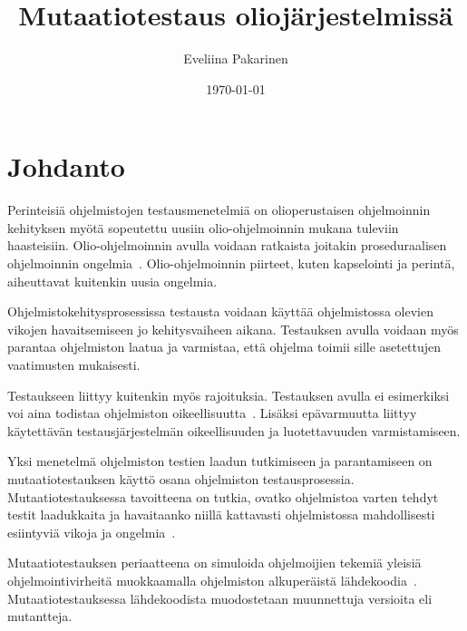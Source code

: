 \documentclass[finnish, grading]{tktltiki2}
\title{Mutaatiotestaus oliojärjestelmissä}
\author{Eveliina Pakarinen}
\date{\today}
\theoremstyle{definition}
\theoremstyle{remark}
\begin{document}

\frontmatter      %

\maketitle        %
\makeabstract     %

\tableofcontents  %


\mainmatter       %




\section{Johdanto}

Perinteisiä ohjelmistojen testausmenetelmiä on olioperustaisen ohjelmoinnin kehityksen myötä sopeutettu uusiin olio-ohjelmoinnin mukana tuleviin haasteisiin. Olio-ohjelmoinnin avulla voidaan ratkaista joitakin proseduraalisen ohjelmoinnin ongelmia~\cite[s. 86]{Mariani:Pezze:2008}. Olio-ohjelmoinnin piirteet, kuten kapselointi ja perintä, aiheuttavat kuitenkin uusia ongelmia.

Ohjelmistokehitysprosessissa testausta voidaan käyttää ohjelmistossa olevien vikojen havaitsemiseen jo kehitysvaiheen aikana. Testauksen avulla voidaan myös parantaa ohjelmiston laatua ja varmistaa, että ohjelma toimii sille asetettujen vaatimusten mukaisesti. 

Testaukseen liittyy kuitenkin myös rajoituksia. Testauksen avulla ei esimerkiksi voi aina todistaa ohjelmiston oikeellisuutta~\cite[s. 58]{Binder:1999}. Lisäksi epävarmuutta liittyy käytettävän testausjärjestelmän oikeellisuuden ja luotettavuuden varmistamiseen.

Yksi menetelmä ohjelmiston testien laadun tutkimiseen ja parantamiseen on mutaatiotestauksen käyttö osana ohjelmiston testausprosessia. Mutaatiotestauksessa tavoitteena on tutkia, ovatko ohjelmistoa varten tehdyt testit laadukkaita ja havaitaanko niillä kattavasti ohjelmistossa mahdollisesti esiintyviä vikoja ja ongelmia~\cite[s. 649]{Jia:Harman:2011}. 

Mutaatiotestauksen periaatteena on simuloida ohjelmoijien tekemiä yleisiä ohjelmointivirheitä muokkaamalla ohjelmiston alkuperäistä lähdekoodia~\cite[s. 649]{Jia:Harman:2011}. Mutaatiotestauksessa lähdekoodista muodostetaan muunnettuja versioita eli mutantteja. 
\end{document}
